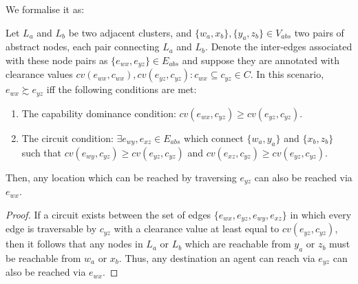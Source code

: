 We formalise it as:
\begin{theorem}
\label{aha-theorem:weakdominance}
Let $L_{a}$ and $L_{b}$ be two adjacent clusters, and $\lbrace w_{a}, x_{b} \rbrace, \lbrace y_{a}, z_{b} \rbrace \in V_{abs}$ two pairs of abstract nodes, each pair connecting $L_{a}$ and $L_{b}$.
Denote the inter-edges associated with these node pairs as $\lbrace e_{wx}, e_{yz} \rbrace \in E_{abs}$ and suppose they are annotated with clearance values $cv(e_{wx}, c_{wx}), cv(e_{yz}, c_{yz}) : c_{wx} \subseteq c_{yz} \in C$.
 In this scenario, $e_{wx} \succsim e_{yz}$ iff the following conditions are met:
\begin{enumerate}
\item{The capability dominance condition: $cv(e_{wx}, c_{yz}) \geq cv(e_{yz}, c_{yz})$}.
\item{The circuit condition: $\exists e_{wy}, e_{xz} \in E_{abs}$ which connect $\lbrace w_{a}, y_{a} \rbrace$ and $\lbrace x_{b}, z_{b} \rbrace$ such that $cv(e_{wy}, c_{yz}) \geq cv(e_{yz}, c_{yz})$ and $cv(e_{xz}, c_{yz}) \geq cv(e_{yz}, c_{yz})$.}
\end{enumerate}
Then, any location which can be reached by traversing $e_{yz}$ can also be reached via $e_{wx}$.
\end{theorem}

\begin{proof}
If a circuit exists between the set of edges $\lbrace e_{wx}, e_{yz}, e_{wy}, e_{xz} \rbrace$ in which every edge is traversable by $c_{yz}$ with a clearance value at least equal to $cv(e_{yz}, c_{yz})$, then it follows that any nodes in $L_{a}$ or $L_{b}$ which are reachable from $y_{a}$ or $z_{b}$ must be reachable from $w_{a}$ or $x_{b}$.
Thus, any destination an agent can reach via $e_{yz}$ can also be reached via $e_{wx}$. 
\end{proof}

